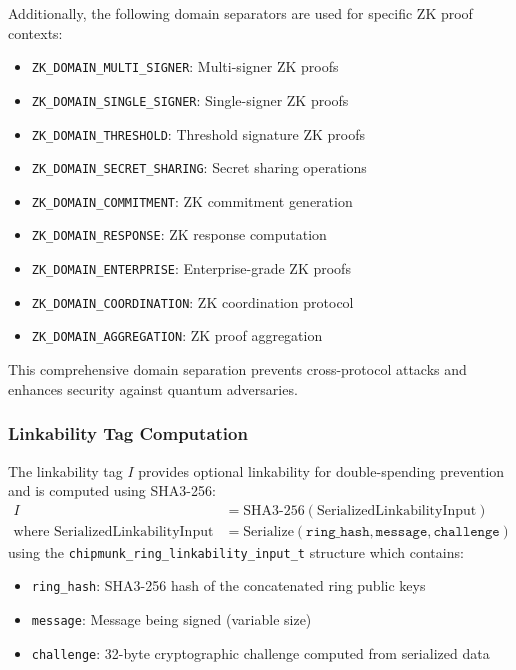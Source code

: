\documentclass[11pt,a4paper]{article}
\begin{document}
Additionally, the following domain separators are used for specific ZK proof contexts:
\begin{itemize}
\item \texttt{ZK\_DOMAIN\_MULTI\_SIGNER}: Multi-signer ZK proofs
\item \texttt{ZK\_DOMAIN\_SINGLE\_SIGNER}: Single-signer ZK proofs  
\item \texttt{ZK\_DOMAIN\_THRESHOLD}: Threshold signature ZK proofs
\item \texttt{ZK\_DOMAIN\_SECRET\_SHARING}: Secret sharing operations
\item \texttt{ZK\_DOMAIN\_COMMITMENT}: ZK commitment generation
\item \texttt{ZK\_DOMAIN\_RESPONSE}: ZK response computation
\item \texttt{ZK\_DOMAIN\_ENTERPRISE}: Enterprise-grade ZK proofs
\item \texttt{ZK\_DOMAIN\_COORDINATION}: ZK coordination protocol
\item \texttt{ZK\_DOMAIN\_AGGREGATION}: ZK proof aggregation
\end{itemize}

This comprehensive domain separation prevents cross-protocol attacks and enhances security against quantum adversaries.

\subsubsection{Linkability Tag Computation}

The linkability tag $I$ provides optional linkability for double-spending prevention and is computed using SHA3-256:
\begin{align*}
I &= \text{SHA3-256}(\text{SerializedLinkabilityInput}) \\
\text{where } \text{SerializedLinkabilityInput} &= \text{Serialize}(\texttt{ring\_hash}, \texttt{message}, \texttt{challenge})
\end{align*}
using the \texttt{chipmunk\_ring\_linkability\_input\_t} structure which contains:
\begin{itemize}
\item \texttt{ring\_hash}: SHA3-256 hash of the concatenated ring public keys
\item \texttt{message}: Message being signed (variable size)
\item \texttt{challenge}: 32-byte cryptographic challenge computed from serialized data
\end{itemize}
\end{document}
